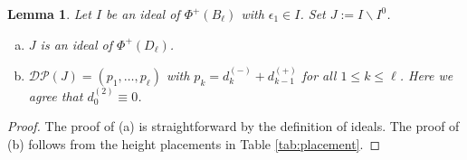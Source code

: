 \documentclass[12pt]{amsart}
\theoremstyle{plain}
\newtheorem{lemma}[theorem]{Lemma}
\theoremstyle{definition}
\theoremstyle{remark}
\newcommand{\DP}{{\mathcal{DP}}}
\begin{document}
 \begin{lemma}
 \label{lem:B-D}
 Let $I$ be an ideal of $\Phi^+(B_\ell)$ with $\epsilon_1 \in I$. 
 Set $J:=I \smallsetminus I^{0}$. 
 \begin{enumerate}[(a)]
\item  $J$ is an ideal of $\Phi^+(D_\ell)$.
\item  $\DP(J)=(p_1,\ldots,p_\ell)$ with $p_k=d_k^{(-)}+d_{k-1}^{(+)}$ for all $1 \le k \le \ell$. 
Here we agree that $d_{0}^{(2)} \equiv 0$.
\end{enumerate}
\end{lemma} 
\begin{proof}
The proof of (a) is straightforward by the definition of ideals. 
The proof of (b) follows from the height placements in Table \ref{tab:placement}.
 \end{proof} 
 

 
\end{document}
